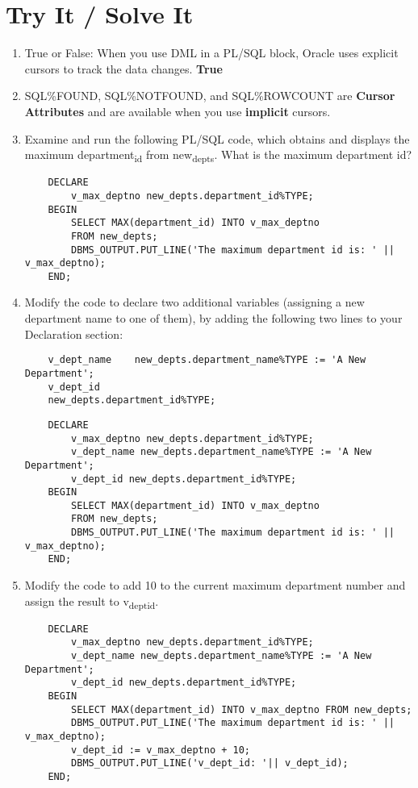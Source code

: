 \documentclass[11pt]{article}
\begin{document}
\section{Try It / Solve It}
\label{sec:org1b141e5}
\begin{enumerate}
\item True or False: When you use DML in a PL/SQL block, Oracle uses explicit cursors to track the data changes.
\textbf{True}
\item SQL\%FOUND, SQL\%NOTFOUND, and SQL\%ROWCOUNT are \textbf{Cursor Attributes} and are available when you use \textbf{implicit} cursors.
\item Examine and run the following PL/SQL code, which obtains and displays the maximum department\textsubscript{id} from new\textsubscript{depts}. What is the maximum department id?

\begin{verbatim}
    DECLARE
        v_max_deptno new_depts.department_id%TYPE;
    BEGIN
        SELECT MAX(department_id) INTO v_max_deptno
        FROM new_depts;
        DBMS_OUTPUT.PUT_LINE('The maximum department id is: ' || v_max_deptno);
    END;
\end{verbatim}

\item Modify the code to declare two additional variables (assigning a new department name to one of them), by adding the following two lines to your Declaration section:

\begin{verbatim}
    v_dept_name    new_depts.department_name%TYPE := 'A New Department';
    v_dept_id
    new_depts.department_id%TYPE;
\end{verbatim}

\begin{verbatim}
    DECLARE
        v_max_deptno new_depts.department_id%TYPE;
        v_dept_name new_depts.department_name%TYPE := 'A New Department';
        v_dept_id new_depts.department_id%TYPE;
    BEGIN
        SELECT MAX(department_id) INTO v_max_deptno
        FROM new_depts;
        DBMS_OUTPUT.PUT_LINE('The maximum department id is: ' || v_max_deptno);
    END;
\end{verbatim}

\item Modify the code to add 10 to the current maximum department number and assign the result to v\textsubscript{dept}\textsubscript{id}.

\begin{verbatim}
    DECLARE
        v_max_deptno new_depts.department_id%TYPE;
        v_dept_name new_depts.department_name%TYPE := 'A New Department';
        v_dept_id new_depts.department_id%TYPE;
    BEGIN
        SELECT MAX(department_id) INTO v_max_deptno FROM new_depts;
        DBMS_OUTPUT.PUT_LINE('The maximum department id is: ' || v_max_deptno);
        v_dept_id := v_max_deptno + 10;
        DBMS_OUTPUT.PUT_LINE('v_dept_id: '|| v_dept_id);
    END;
\end{verbatim}


\end{enumerate}
\end{document}
